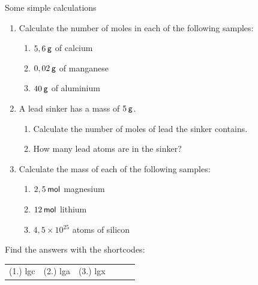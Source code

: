    \noindent
\label{m38717*secfhsst!!!underscore!!!id539}
            \begin{exercises} {Some simple calculations}
            \nopagebreak
      \label{m38717*id278090}\begin{enumerate}[noitemsep, label=\textbf{\arabic*}. ] 
            \label{m38717*uid24}\item Calculate the number of moles in each of the following samples:
\label{m38717*id278106}\begin{enumerate}[noitemsep, label=\textbf{\alph*}. ] 
            \label{m38717*uid25}\item $5,6\phantom{\rule{2pt}{0ex}}\mathsf{g}$ of calcium
\label{m38717*uid26}\item $0,02\phantom{\rule{2pt}{0ex}}\mathsf{g}$ of manganese
\label{m38717*uid27}\item $40\phantom{\rule{2pt}{0ex}}\mathsf{g}$ of aluminium
\end{enumerate}
                \label{m38717*uid28}\item A lead sinker has a mass of $5\phantom{\rule{2pt}{0ex}}\mathsf{g}$.
\label{m38717*id278159}\begin{enumerate}[noitemsep, label=\textbf{\alph*}. ] 
            \label{m38717*uid29}\item Calculate the number of moles of lead the sinker contains.
\label{m38717*uid30}\item How many lead atoms are in the sinker?
\end{enumerate}
                \label{m38717*uid31}\item Calculate the mass of each of the following samples:
\label{m38717*id278201}\begin{enumerate}[noitemsep, label=\textbf{\alph*}. ] 
            \label{m38717*uid32}\item $2,5\phantom{\rule{2pt}{0ex}}\mathsf{mol}$ magnesium
\label{m38717*uid33}\item $12\phantom{\rule{2pt}{0ex}}\mathsf{mol}$ lithium
\label{m38717*uid34}\item $4,5\ensuremath{\times} 10{}^{25}$ atoms of silicon
\end{enumerate}
                \end{enumerate}
    \label{m38717*cid5}
\par {} Find the answers with the shortcodes:
 \par \begin{tabular}[h]{cccccc}
 (1.) lgc  &  (2.) lga  &  (3.) lgx  & \end{tabular}
\end{exercises}
